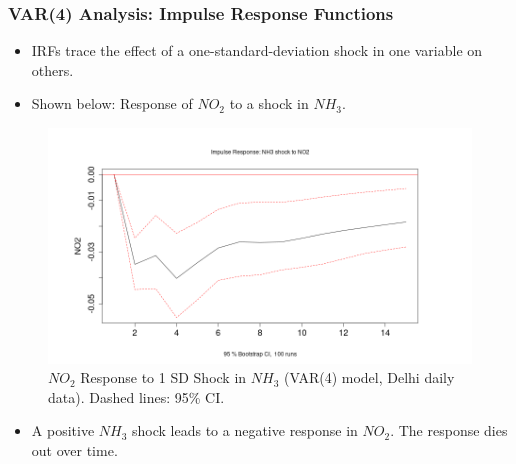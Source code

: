 \documentclass[svgnames, 12pt]{beamer}
\begin{document}
\begin{frame}
    \frametitle{VAR(4) Analysis: Impulse Response Functions}
    \begin{itemize}
        \item IRFs trace the effect of a one-standard-deviation shock in one variable on others.
        \item Shown below: Response of $NO_2$ to a shock in $NH_3$.
    \end{itemize}
    \begin{figure}
        \includegraphics[width=0.9\linewidth]{../analysis/assets/irf_nh3_no2.png}
        \caption{$NO_2$ Response to 1 SD Shock in $NH_3$ (VAR(4) model, Delhi daily data). Dashed lines: 95\% CI.}
    \end{figure}
    \begin{itemize}
        \item \footnotesize A positive $NH_3$ shock leads to a negative response in $NO_2$. The response dies out over time.
    \end{itemize}
\end{frame}
\end{document}
